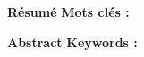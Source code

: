 

\thispagestyle{backcover}

\begin{changemargin}{3mm}{0cm}
    \begin{minipage}[c]{0.96\columnwidth}
        
        
        
        
        {\LARGE\textbf{Résumé}}
        \vskip1mm
            \begingroup
                \large
                \@frenchAbstract
            \endgroup
        \vskip1mm
        {\textbf{Mots clés : }
            \begingroup
                \@frenchAbstractKeywords
            \endgroup
        }
        
        {\vskip25mm}
        
        {\LARGE\textbf{Abstract}}
        \vskip1mm
            \begingroup
                \large
                \@englishAbstract
            \endgroup
        \vskip1mm
        {\textbf{Keywords : }
            \begingroup
                \@englishAbstractKeywords
            \endgroup
        }
    \end{minipage}
    
\end{changemargin}